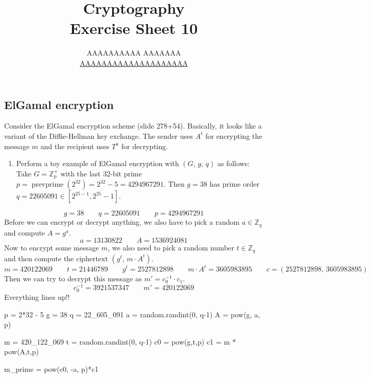 \documentclass{article}
\title{Cryptography \\ Exercise Sheet 10}
\author{
  AAAAAAAAAA AAAAAAA \\
  \href{mailto:AAAAAAAAAAAAAAAAAAAA}{AAAAAAAAAAAAAAAAAAAA}
}
\newcommand{\Z}{\mathbb{Z}}
\begin{document}
  \maketitle

  \setcounter{section}{10}
  \subsection{ElGamal encryption}
  \begin{centerframebox}
    Consider the ElGamal encryption scheme (slide 278+54). Basically, it looks
    like a variant of the Diffie-Hellman key exchange. The sender uses $A^t$
    for encrypting the message $m$ and the recipient uses $T^a$ for decrypting.

    \begin{enumerate}[label=(\roman*)]
      \item Perform a toy example of ElGamal encryption with $(G,\, g,\, q)$ as follows:
      Take $G = \Z^\times_p$  with the last 32-bit prime $p = \operatorname{prevprime}(2^{32}) = 2^{32} - 5 = 4 294 967 291$.
      Then $g = 38$ has prime order $q = 22 605 091 \in [2^{25-1}, 2^{25}-1]$.
    \end{enumerate}
  \end{centerframebox}
  \[ g = 38 \qquad q = 22 605 091 \qquad p = 4 294 967 291 \]
  Before we can encrypt or decrypt anything, we also have to pick a random $a \in \Z_q$ and compute $A = g^a$.
  \[ a = 13 130 822 \qquad A = 1 536 924 081 \]
  Now to encrypt some message $m$, we also need to pick a random number $t \in \Z_q$
  and then compute the ciphertext $(g^t,\, m \cdot A^t)$.
  \[ m = 420 122 069 \qquad t = 21 446 789 \qquad  g^t = 2 527 812 898 \qquad m \cdot A^t = 3 605 983 895
  \qquad c = (2 527 812 898,\, 3 605 983 895 ) \]
  Then we can try to decrypt this message as $m' = c_0^{-1} \cdot c_1$.
  \[ c_0^{-1} = 3 921 537 347 \qquad m' = 420 122 069 \]
  Everything lines up!!

  \begin{mylisting}
    p = 2*32 - 5
    g = 38
    q = 22_605_091
    a = random.randint(0, q-1)
    A = pow(g, a, p)

    m = 420_122_069
    t = random.randint(0, q-1)
    c0 = pow(g,t,p)
    c1 = m * pow(A,t,p) %

    m_prime = pow(c0, -a, p)*c1 %
  \end{mylisting}
\end{document}
